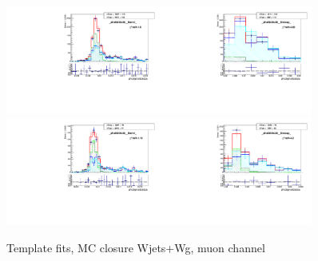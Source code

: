 \begin{figure}[htb]
\begin{center}
   \includegraphics[width=0.45\textwidth]{../figs/figs_v11/MUON_WGamma/MCclosureWjetsPlusWg/c_TEMPL_SIHIH_UNblind__phoEt25to30__Barrel__RooFit_MCclosure.pdf}\includegraphics[width=0.45\textwidth]{../figs/figs_v11/MUON_WGamma/MCclosureWjetsPlusWg/c_TEMPL_SIHIH_UNblind__phoEt25to30__Endcap__RooFit_MCclosure.pdf}\\
   \includegraphics[width=0.45\textwidth]{../figs/figs_v11/MUON_WGamma/MCclosureWjetsPlusWg/c_TEMPL_SIHIH_UNblind__phoEt30to35__Barrel__RooFit_MCclosure.pdf}\includegraphics[width=0.45\textwidth]{../figs/figs_v11/MUON_WGamma/MCclosureWjetsPlusWg/c_TEMPL_SIHIH_UNblind__phoEt30to35__Endcap__RooFit_MCclosure.pdf}\\
  \label{fig:templateFits_MCclosureWjetsPlusWg_SIHIH_MUON_1}
  \caption{Template fits, MC closure Wjets+Wg, muon channel}
  \end{center}
\end{figure}

